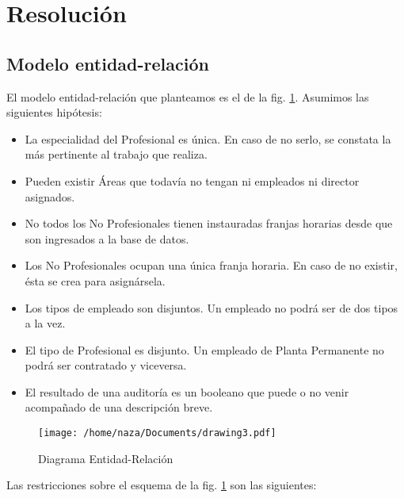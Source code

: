 \section{Resolución}
\subsection{Modelo entidad-relación}

El modelo entidad-relación que planteamos es el de la fig. \ref{fig:der}.
Asumimos las siguientes hipótesis:

\begin{itemize}
    \item La especialidad del Profesional es única. En caso de no serlo, se 
        constata la más pertinente al trabajo que realiza.
    \item Pueden existir Áreas que todavía no tengan ni empleados ni director 
        asignados.
    \item No todos los No Profesionales tienen instauradas franjas horarias 
        desde que son ingresados a la base de datos.
    \item Los No Profesionales ocupan una única franja horaria. En caso de no 
        existir, ésta se crea para asignársela.
    \item Los tipos de empleado son disjuntos. Un empleado no podrá ser de dos 
        tipos a la vez.
    \item El tipo de Profesional es disjunto. Un empleado de Planta Permanente 
        no podrá ser contratado y viceversa.
    \item El resultado de una auditoría es un booleano que puede o no venir 
        acompañado de una descripción breve.
\end{itemize}

\begin{landscape}
\begin{figure}[h]
    \centering
    \texttt{[image: /home/naza/Documents/drawing3.pdf]}
    \caption{Diagrama Entidad-Relación}
    \label{fig:der}
\end{figure}
\end{landscape}

Las restricciones sobre el esquema de la fig. \ref{fig:der} son las siguientes:

